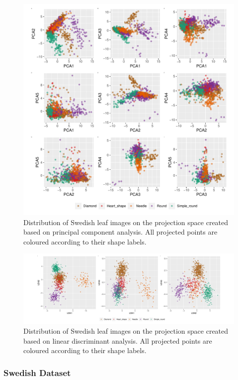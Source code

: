 \documentclass{article}
\begin{document}
\begin{figure}
\centering
\includegraphics{img/pcaswedish-1.pdf}
\caption{\label{pcaswedish}Distribution of Swedish leaf images on the
projection space created based on principal component analysis. All
projected points are coloured according to their shape labels.}
\end{figure}

\begin{figure}
\centering
\includegraphics{img/ldaswedish-1.pdf}
\caption{\label{ldaswedish}Distribution of Swedish leaf images on the
projection space created based on linear discriminant analysis. All
projected points are coloured according to their shape labels.}
\end{figure}

\hypertarget{swedish-dataset}{%
\subsubsection{Swedish Dataset}\label{swedish-dataset}}
\end{document}
